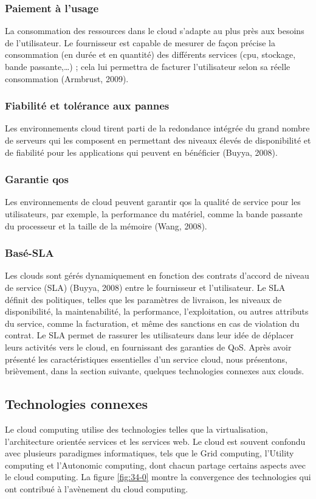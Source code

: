       \subsubsection{Paiement à l’usage}
       La consommation des ressources dans le cloud s’adapte au plus près aux besoins de l’utilisateur. Le fournisseur est capable de mesurer de façon précise la consommation (en durée et en quantité) des différents services (\ac{cpu}, stockage, bande passante,…) ; cela lui permettra de facturer l’utilisateur selon sa réelle consommation (Armbrust, 2009). 
      \subsubsection{Fiabilité et tolérance aux pannes}
       Les environnements cloud tirent parti de la redondance intégrée du grand nombre de serveurs qui les composent en permettant des niveaux élevés de disponibilité et de fiabilité pour les applications qui peuvent en bénéficier (Buyya, 2008). 
      \subsubsection{Garantie \ac{qos} }
       Les environnements de cloud peuvent garantir \ac{qos} la qualité de service pour les utilisateurs, par exemple, la performance du matériel, comme la bande passante du processeur et la taille de la mémoire (Wang, 2008). 
       
    	  \subsubsection{Basé-SLA}
    	   Les clouds sont gérés dynamiquement en fonction des contrats d’accord de niveau de service (SLA) (Buyya, 2008) entre le fournisseur et l’utilisateur. Le SLA définit des politiques, telles que les paramètres de livraison, les niveaux de disponibilité, la maintenabilité, la performance, l'exploitation, ou autres attributs du service, comme la facturation, et même des sanctions en cas de violation du contrat. Le SLA permet de rassurer les utilisateurs dans leur idée de déplacer leurs activités vers le cloud, en fournissant des garanties de QoS. 
    	Après avoir présenté les caractéristiques essentielles d’un service cloud, nous présentons, brièvement, dans la section suivante, quelques technologies connexes aux clouds.
    	
 
\subsection{Technologies connexes }
Le cloud computing  utilise des technologies telles que la virtualisation, l'architecture orientée services et les services web. Le cloud est souvent confondu avec plusieurs paradigmes informatiques, tels que le Grid computing, l’Utility computing  et l’Autonomic computing, dont chacun partage certains aspects avec le cloud computing. La figure \ref{fig:34-0} montre la convergence des technologies qui ont contribué à l'avènement du cloud computing. 

